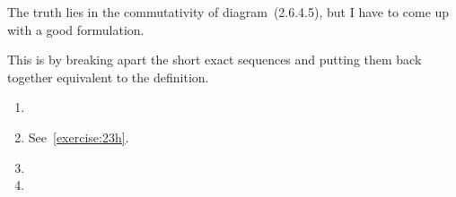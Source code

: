 \begin{exercise} %
  The truth lies in the commutativity of diagram~(2.6.4.5), but I have to come up with a good formulation.
\end{exercise}

\begin{exercise}
  This is by breaking apart the short exact sequences and putting them back together equivalent to the definition.
\end{exercise}

\begin{exercise}
  \begin{enumerate}
    \item 

    \item See~\autoref{exercise:23h}.

    \item 

    \item 
  \end{enumerate}
\end{exercise}
